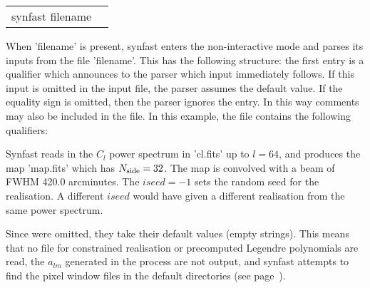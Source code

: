 \begin{examples}{2}
{
\begin{tabular}{ll} %
synfast  filename \\
\end{tabular}
}
{When 'filename' is present, synfast enters the non-interactive mode and parses
its inputs from the file 'filename'. This has the following
structure: the first entry is a qualifier which announces to the parser
which input immediately follows. If this input is omitted in the
input file, the parser assumes the default value.
If the equality sign is omitted, then the parser ignores the entry.
In this way comments may also be included in the file.
In this example, the file contains the following qualifiers:\hfill\newline
{}

Synfast reads in the $C_l$ power spectrum in 'cl.fits' up to $l=64$, and produces the map
'map.fits' which has $N_{\rm side}=32$.
The map is convolved with a beam of FWHM 420.0 arcminutes. The $iseed=-1$ sets
the random seed for the realisation. A different $iseed$ would have given a different 
realisation from the same power spectrum.

Since \hfill\newline
{}
were omitted, they take their default values (empty strings). 
This means that no file for constrained realisation or precomputed
Legendre polynomials are read, the $a_{lm}$ generated in the process are not
output, and synfast attempts to find the pixel
window files in the default directories (see page~\pageref{page:defdir}).
}
\end{examples}

